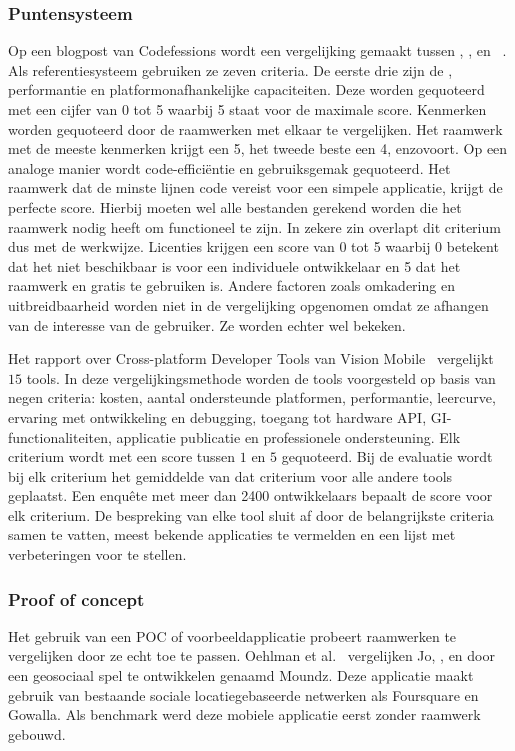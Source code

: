 \subsubsection{Puntensysteem}
\label{sec:manier-puntensysteem}
Op een blogpost van Codefessions wordt een vergelijking gemaakt tussen \jqm{}, \st{}, \jqt{} en \kendo{}~\cite{Sarrafi2012a}.  
Als referentiesysteem gebruiken ze zeven criteria.  
De eerste drie zijn de , performantie en platformonafhankelijke capaciteiten.  
Deze worden gequoteerd met een cijfer van 0 tot 5 waarbij 5 staat voor de maximale score.
Kenmerken worden gequoteerd door de raamwerken met elkaar te vergelijken.  
Het raamwerk met de meeste kenmerken krijgt een 5, het tweede beste een 4, enzovoort. 
Op een analoge manier wordt code-efficiëntie en gebruiksgemak gequoteerd.  
Het raamwerk dat de minste lijnen code vereist voor een simpele applicatie, krijgt de perfecte score. 
Hierbij moeten wel alle bestanden gerekend worden die het raamwerk nodig heeft om functioneel te zijn. 
In zekere zin overlapt dit criterium dus met de  werkwijze.
Licenties krijgen een score van 0 tot 5 waarbij 0 betekent dat het niet beschikbaar is voor een individuele ontwikkelaar en 5 dat het raamwerk  en gratis te gebruiken is. 
Andere factoren zoals omkadering en uitbreidbaarheid worden niet in de vergelijking opgenomen omdat ze afhangen van de interesse van de gebruiker.  
Ze worden echter wel bekeken.


Het rapport over Cross-platform Developer Tools van Vision Mobile~\cite{Mobile2012} vergelijkt $15$  tools.
In deze vergelijkingsmethode worden de tools voorgesteld op basis van negen criteria:  kosten,  aantal ondersteunde platformen,  performantie,  leercurve,  ervaring met ontwikkeling en debugging,  toegang tot hardware API,  GI-functionaliteiten,  applicatie publicatie en professionele ondersteuning.
Elk criterium wordt met een score tussen $1$ en $5$ gequoteerd.
Bij de evaluatie wordt bij elk criterium het gemiddelde van dat criterium voor alle andere  tools geplaatst.
Een enquête met meer dan 2400 ontwikkelaars bepaalt de score voor elk criterium.
De bespreking van elke tool sluit af door de belangrijkste criteria samen te vatten,  meest bekende applicaties te vermelden en een lijst met verbeteringen voor te stellen.

\subsubsection{Proof of concept}
\label{sec:manier-poc}
Het gebruik van een POC of voorbeeldapplicatie probeert raamwerken te vergelijken door ze echt toe te passen.
Oehlman et al.~\cite{Oeflman2011} vergelijken Jo, \jqt{},  \jqm{} en \st{} door een geosociaal spel te ontwikkelen genaamd Moundz. 
Deze applicatie maakt gebruik van bestaande sociale locatiegebaseerde netwerken als Foursquare en Gowalla.
Als benchmark werd deze mobiele applicatie eerst zonder raamwerk gebouwd.


